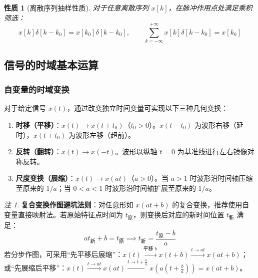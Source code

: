 \documentclass[11pt,a4paper,fontset=fandol]{ctexart}
\newtheorem{property}[theorem]{性质}
\theoremstyle{remark}
\newtheorem{remark}{注}[section]
\begin{document}
\begin{property}[离散序列抽样性质]
对于任意离散序列 $x[k]$，在脉冲作用点处满足乘积筛选：
\begin{equation}
    x[k]\delta[k - k_0] = x[k_0]\delta[k - k_0], \qquad \sum_{k=-\infty}^{+\infty} x[k]\delta[k - k_0] = x[k_0]
\end{equation}
\end{property}

\subsection{信号的时域基本运算}

\subsubsection{自变量的时域变换}
对于给定信号 $x(t)$，通过改变独立时间变量可实现以下三种几何变换：
\begin{enumerate}
    \item \textbf{时移（平移）}：$x(t) \to x(t \mp t_0)$（$t_0 > 0$）。$x(t - t_0)$ 为波形右移（延时），$x(t + t_0)$ 为波形左移（超前）。
    \item \textbf{反转（翻转）}：$x(t) \to x(-t)$。波形以纵轴 $t = 0$ 为基准线进行左右镜像对称反转。
    \item \textbf{尺度变换（展缩）}：$x(t) \to x(at)$（$a > 0$）。当 $a > 1$ 时波形沿时间轴压缩至原来的 $1/a$；当 $0 < a < 1$ 时波形沿时间轴扩展至原来的 $1/a$。
\end{enumerate}

\begin{remark}
\textbf{复合变换作图避坑法则}：对任意形如 $x(at + b)$ 的复合变换，推荐使用自变量直接映射法。若原始特征点时间为 $t_{\text{原}}$，则变换后对应的新时间位置 $t_{\text{新}}$ 满足：
\begin{equation}
    a t_{\text{新}} + b = t_{\text{原}} \implies t_{\text{新}} = \frac{t_{\text{原}} - b}{a}
\end{equation}
若分步作图，可采用“先平移后展缩”：$x(t) \xrightarrow{\text{平移 } b} x(t + b) \xrightarrow{t \to at} x(at + b)$；或“先展缩后平移”：$x(t) \xrightarrow{t \to at} x(at) \xrightarrow{t \to t + \frac{b}{a}} x\left(a\left(t + \frac{b}{a}\right)\right) = x(at + b)$。
\end{remark}
\end{document}
